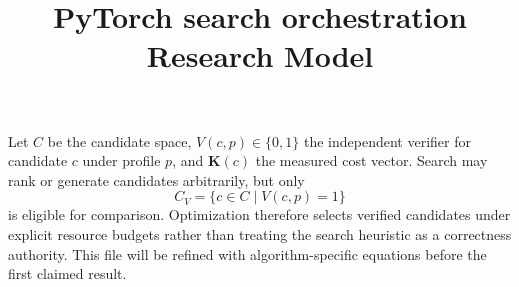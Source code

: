 \documentclass{article}
\title{PyTorch search orchestration Research Model}
\begin{document}
\maketitle
Let $C$ be the candidate space, $V(c,p)\in\{0,1\}$ the independent verifier
for candidate $c$ under profile $p$, and $\mathbf{K}(c)$ the measured cost
vector. Search may rank or generate candidates arbitrarily, but only
\[
  C_V = \{c\in C\mid V(c,p)=1\}
\]
is eligible for comparison. Optimization therefore selects verified candidates
under explicit resource budgets rather than treating the search heuristic as a
correctness authority. This file will be refined with algorithm-specific
equations before the first claimed result.
\end{document}
